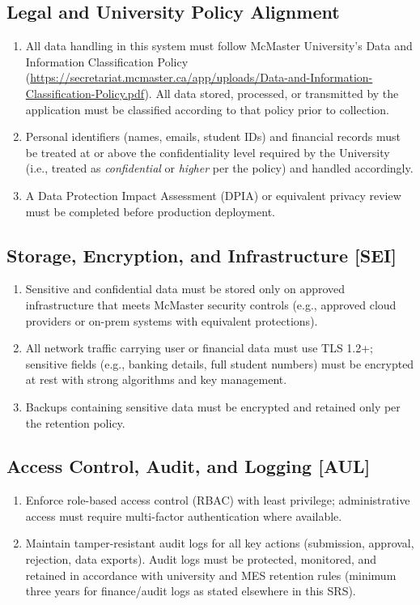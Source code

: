 \documentclass[12pt]{article}
\begin{document}
\begin{enumerate}
\subsection{Legal and University Policy Alignment}
\begin{enumerate}
  \item All data handling in this system must follow McMaster University's Data and Information Classification Policy (\url{https://secretariat.mcmaster.ca/app/uploads/Data-and-Information-Classification-Policy.pdf}).  All data stored, processed, or transmitted by the application must be classified according to that policy prior to collection.
  \item Personal identifiers (names, emails, student IDs) and financial records must be treated at or above the confidentiality level required by the University (i.e., treated as \textit{confidential} or \textit{higher} per the policy) and handled accordingly.
  \item A Data Protection Impact Assessment (DPIA) or equivalent privacy review must be completed before production deployment.
\end{enumerate}

\subsection{Storage, Encryption, and Infrastructure [SEI]}
\begin{enumerate}
  \item Sensitive and confidential data must be stored only on approved infrastructure that meets McMaster security controls (e.g., approved cloud providers or on-prem systems with equivalent protections).
  \item All network traffic carrying user or financial data must use TLS 1.2+; sensitive fields (e.g., banking details, full student numbers) must be encrypted at rest with strong algorithms and key management.
  \item Backups containing sensitive data must be encrypted and retained only per the retention policy.
\end{enumerate}

\subsection{Access Control, Audit, and Logging [AUL]}
\begin{enumerate}
  \item Enforce role-based access control (RBAC) with least privilege; administrative access must require multi-factor authentication where available.
  \item Maintain tamper-resistant audit logs for all key actions (submission, approval, rejection, data exports). Audit logs must be protected, monitored, and retained in accordance with university and MES retention rules (minimum three years for finance/audit logs as stated elsewhere in this SRS).
\end{enumerate}


\end{enumerate}
\end{document}
